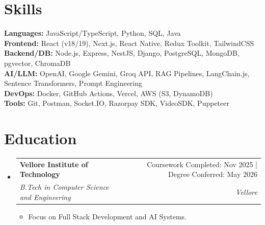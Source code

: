 \documentclass[a4paper,10pt]{article}
\makeatletter
\newcommand{\resumeItem}[1]{
  \item\small{{#1 \vspace{-2pt}}}
}
\newcommand{\resumeSubheading}[4]{
  \vspace{-2pt}\item
    \begin{tabular*}{\textwidth}{l@{\extracolsep{\fill}}r}
      \textbf{#1} & #2 \\
      \textit{\small#3} & \textit{\small #4} \\
    \end{tabular*}\vspace{-7pt}
}
\newcommand{\resumeSubHeadingListStart}{\begin{itemize}[leftmargin=0.15in, label={}]}
\newcommand{\resumeSubHeadingListEnd}{\end{itemize}}
\newcommand{\resumeItemListStart}{\begin{itemize}}
\newcommand{\resumeItemListEnd}{\end{itemize}\vspace{-5pt}}
\makeatother
\begin{document}
\section{Skills}
 \begin{itemize}[leftmargin=0.15in, label={}]
    \small{\item{
     \textbf{Languages:}{ JavaScript/TypeScript, Python, SQL, Java} \\
     \textbf{Frontend:}{ React (v18/19), Next.js, React Native, Redux Toolkit, TailwindCSS} \\
     \textbf{Backend/DB:}{ Node.js, Express, NestJS, Django, PostgreSQL, MongoDB, pgvector, ChromaDB} \\
     \textbf{AI/LLM:}{ OpenAI, Google Gemini, Groq API, RAG Pipelines, LangChain.js, Sentence Transformers, Prompt Engineering} \\
     \textbf{DevOps:}{ Docker, GitHub Actions, Vercel, AWS (S3, DynamoDB)} \\
     \textbf{Tools:}{ Git, Postman, Socket.IO, Razorpay SDK, VideoSDK, Puppeteer}
    }}
 \end{itemize}

\section{Education}
  \resumeSubHeadingListStart
    \resumeSubheading
      {Vellore Institute of Technology}{Coursework Completed: Nov 2025 | Degree Conferred: May 2026}
      {B.Tech in Computer Science and Engineering}{Vellore}
      \resumeItemListStart
        \resumeItem{Focus on Full Stack Development and AI Systems.}
      \resumeItemListEnd
  \resumeSubHeadingListEnd
\end{document}
